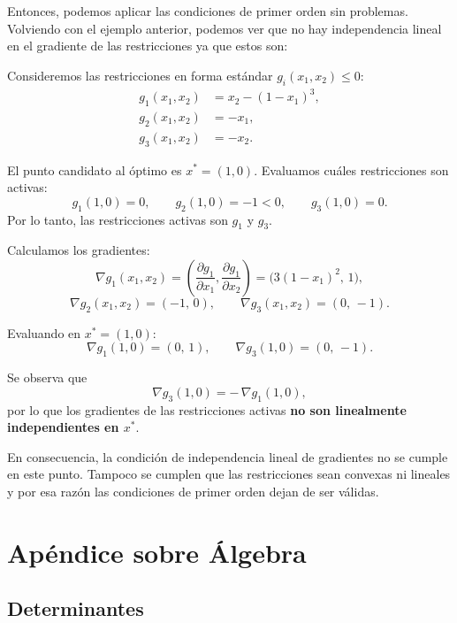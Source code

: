 \documentclass{article}
\begin{document}
Entonces, podemos aplicar las condiciones de primer orden sin problemas.\\


Volviendo con el ejemplo anterior, podemos ver que no hay independencia lineal en el gradiente de las restricciones ya que estos son: 



Consideremos las restricciones en forma estándar \( g_i(x_1,x_2) \le 0 \):
\[
\begin{aligned}
g_1(x_1,x_2) &= x_2 - (1-x_1)^3,\\
g_2(x_1,x_2) &= -x_1,\\
g_3(x_1,x_2) &= -x_2.
\end{aligned}
\]

El punto candidato al óptimo es \(x^*=(1,0)\).  
Evaluamos cuáles restricciones son activas:
\[
g_1(1,0)=0,\qquad g_2(1,0)=-1<0,\qquad g_3(1,0)=0.
\]
Por lo tanto, las restricciones activas son \(g_1\) y \(g_3\).

\vspace{0.5em}
Calculamos los gradientes:
\[
\nabla g_1(x_1,x_2)
=\left(
\frac{\partial g_1}{\partial x_1},\frac{\partial g_1}{\partial x_2}
\right)
=\big(3(1-x_1)^2,\,1\big),
\]
\[
\nabla g_2(x_1,x_2)=(-1,\,0), \qquad
\nabla g_3(x_1,x_2)=(0,\,-1).
\]

Evaluando en \(x^*=(1,0)\):
\[
\nabla g_1(1,0)=(0,\,1), \qquad
\nabla g_3(1,0)=(0,\,-1).
\]

\vspace{0.5em}
Se observa que
\[
\nabla g_3(1,0)=-\,\nabla g_1(1,0),
\]
por lo que los gradientes de las restricciones activas
\textbf{no son linealmente independientes en \(x^*\)}. 

En consecuencia, la condición de independencia lineal de gradientes no se cumple en este punto. Tampoco se cumplen que las restricciones sean convexas ni lineales y por esa razón las condiciones de primer orden dejan de ser válidas. \\





\newpage

\appendix

\section{Apéndice sobre Álgebra}
\subsection*{Determinantes}
\end{document}
